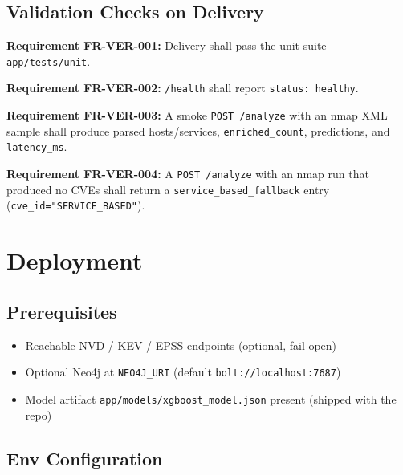 \documentclass[10pt,journal,onecolumn]{IEEEtran}
\newcommand{\reqid}[1]{\textbf{#1}}
\begin{document}
\subsection{Validation Checks on Delivery}

\reqid{Requirement FR-VER-001:} Delivery shall pass the unit suite \texttt{app/tests/unit}.

\reqid{Requirement FR-VER-002:} \texttt{/health} shall report \texttt{status: healthy}.

\reqid{Requirement FR-VER-003:} A smoke \texttt{POST /analyze} with an nmap XML sample shall produce parsed hosts/services, \texttt{enriched\_count}, predictions, and \texttt{latency\_ms}.

\reqid{Requirement FR-VER-004:} A \texttt{POST /analyze} with an nmap run that produced no CVEs shall return a \texttt{service\_based\_fallback} entry (\texttt{cve\_id="SERVICE\_BASED"}).

\section{Deployment}

\subsection{Prerequisites}

\begin{itemize}
\item Reachable NVD / KEV / EPSS endpoints (optional, fail-open)
\item Optional Neo4j at \texttt{NEO4J\_URI} (default \texttt{bolt://localhost:7687})
\item Model artifact \texttt{app/\allowbreak models/\allowbreak xgboost\_\allowbreak model.\allowbreak json} present (shipped with the repo)
\end{itemize}

\subsection{Env Configuration}
\end{document}
